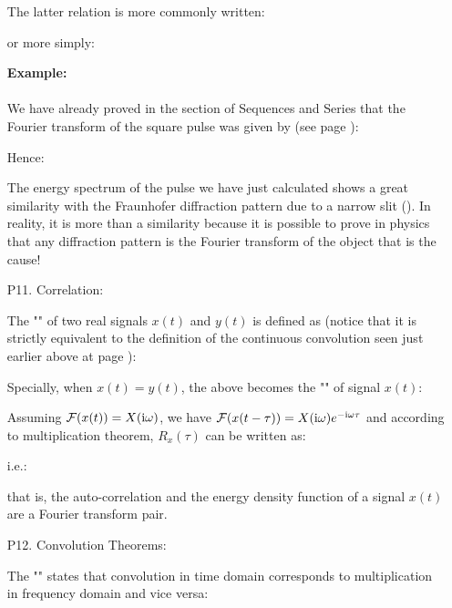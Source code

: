 \begin{itemize}
	The latter relation is more commonly written:
	
	or more simply:
	
	\begin{tcolorbox}[colframe=black,colback=white,sharp corners]
	\textbf{{\Large {}}Example:}\\\\
	We have already proved in the section of Sequences and Series that the Fourier transform of the square pulse was given by (see page \pageref{fourier transform pulse square}):
	
	Hence:
	
	\end{tcolorbox}
	
	\begin{tcolorbox}[colframe=black,colback=white,sharp corners]
	The energy spectrum of the pulse we have just calculated shows a great similarity with the Fraunhofer diffraction pattern due to a narrow slit (). In reality, it is more than a similarity because it is possible to prove in physics that any diffraction pattern is the Fourier transform of the object that is the cause!
	\end{tcolorbox}
	
	
	\item[P11.] Correlation:
	
	The "" of two real signals $x(t)$ and $y(t)$ is defined as (notice that it is strictly equivalent to the definition of the continuous convolution seen just earlier above at page \pageref{continuous convolution}):
	
	Specially, when $x(t)=y(t)$, the above becomes the "" of signal $x(t)$:
	
	Assuming ${\cal F}(x(t))=X(\mathrm{i}\omega)$, we have ${\cal F}(x(t-\tau))=X(\mathrm{i}\omega)e^{-\mathrm{i}\omega\tau}$ and according to multiplication theorem, $R_x(\tau)$ can be written as:
	
	i.e.:
	
	that is, the auto-correlation and the energy density function of a signal $x(t)$ are a Fourier transform pair.
	
	\item[P12.] Convolution Theorems:
	
	The "\label{convolution theorem}" states that convolution in time domain corresponds to multiplication in frequency domain and vice versa:
	

\end{itemize}

